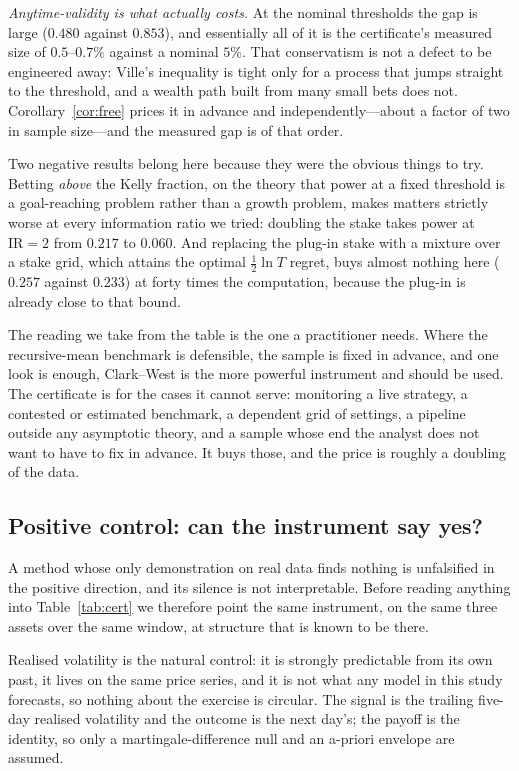 \documentclass{article}
\theoremstyle{plain}
\theoremstyle{definition}
\begin{document}
\emph{Anytime-validity is what actually costs.} At the nominal thresholds the gap is large
($0.480$ against $0.853$), and essentially all of it is the certificate's measured size of
$0.5$--$0.7\%$ against a nominal $5\%$. That conservatism is not a defect to be engineered
away: Ville's inequality is tight only for a process that jumps straight to the threshold, and
a wealth path built from many small bets does not. Corollary~\ref{cor:free} prices it in
advance and independently---about a factor of two in sample size---and the measured gap is of
that order.

Two negative results belong here because they were the obvious things to try. Betting
\emph{above} the Kelly fraction, on the theory that power at a fixed threshold is a
goal-reaching problem rather than a growth problem, makes matters strictly worse at every
information ratio we tried: doubling the stake takes power at $\mathrm{IR}=2$ from $0.217$ to
$0.060$. And replacing the plug-in stake with a mixture over a stake grid, which attains the
optimal $\tfrac12\ln T$ regret, buys almost nothing here ($0.257$ against $0.233$) at forty
times the computation, because the plug-in is already close to that bound.

The reading we take from the table is the one a practitioner needs. Where the recursive-mean
benchmark is defensible, the sample is fixed in advance, and one look is enough, Clark--West
is the more powerful instrument and should be used. The certificate is for the cases it cannot
serve: monitoring a live strategy, a contested or estimated benchmark, a dependent grid of
settings, a pipeline outside any asymptotic theory, and a sample whose end the analyst does
not want to have to fix in advance. It buys those, and the price is roughly a doubling of the
data.

\subsection{Positive control: can the instrument say yes?}
\label{sec:positive}

A method whose only demonstration on real data finds nothing is unfalsified in the positive
direction, and its silence is not interpretable. Before reading anything into
Table~\ref{tab:cert} we therefore point the same instrument, on the same three assets over the
same window, at structure that is known to be there.

Realised volatility is the natural control: it is strongly predictable from its own past, it
lives on the same price series, and it is not what any model in this study forecasts, so
nothing about the exercise is circular. The signal is the trailing five-day realised volatility
and the outcome is the next day's; the payoff is the identity, so only a martingale-difference
null and an a-priori envelope are assumed.
\end{document}
